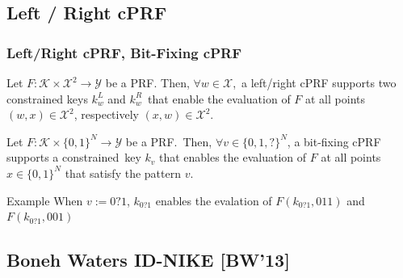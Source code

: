\documentclass{beamer}
\begin{document}
\subsection{Left / Right cPRF}
\begin{frame}
    \frametitle{Left/Right cPRF, Bit-Fixing cPRF}

       \begin{definition}
        Let $F : \mathcal{K} \times \mathcal{X}^2 \rightarrow \mathcal{Y}$ be a PRF. Then, $\forall w \in \mathcal{X}$,\
        a left/right cPRF supports two constrained keys $k_w^L$ and $k_w^R$\
        that enable the evaluation of $F$ at all points\
        $(w,x) \in \mathcal{X}^2$, respectively $(x,w) \in \mathcal{X}^2$.
        \end{definition}

	\pause
        \begin{definition}
        Let $F : \mathcal{K} \times \{0,1\}^N \rightarrow \mathcal{Y}$ be a PRF.\
        Then, $\forall v \in \{0,1,?\}^N$, a bit-fixing cPRF  supports a constrained\
        key $k_v$ that enables the evaluation of $F$ at all points $x \in \{0,1\}^N$ that satisfy the pattern $v$.
        \end{definition}

	\pause
        \begin{exampleblock}{Example}
            When $v:={0?1}$, $k_{0?1}$ enables the evalation of $F(k_{0?1}, 011)$ and $F(k_{0?1}, 001)$
        \end{exampleblock}

\end{frame}



\subsection{Boneh Waters ID-NIKE [BW'13]}
\end{document}
